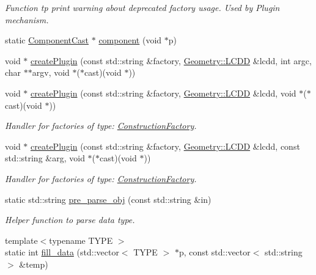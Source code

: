 \begin{DoxyCompactItemize}
\begin{DoxyCompactList}\small\item\em Function tp print warning about deprecated factory usage. Used by Plugin mechanism. \item\end{DoxyCompactList}\item 
static \hyperlink{class_d_d4hep_1_1_component_cast}{ComponentCast} $\ast$ \hyperlink{namespace_d_d4hep_a9bd7c6fd6580a172a3d0a09eb3ea4793}{component} (void $\ast$p)
\item 
void $\ast$ \hyperlink{namespace_d_d4hep_ade40a96f4a17f0bf9cc042946bf4a5aa}{createPlugin} (const std::string \&factory, \hyperlink{class_d_d4hep_1_1_geometry_1_1_l_c_d_d}{Geometry::LCDD} \&lcdd, int argc, char $\ast$$\ast$argv, void $\ast$($\ast$cast)(void $\ast$))
\item 
void $\ast$ \hyperlink{namespace_d_d4hep_a65fff585aba587323f89c263548cad90}{createPlugin} (const std::string \&factory, \hyperlink{class_d_d4hep_1_1_geometry_1_1_l_c_d_d}{Geometry::LCDD} \&lcdd, void $\ast$($\ast$cast)(void $\ast$))
\begin{DoxyCompactList}\small\item\em Handler for factories of type: \hyperlink{class_d_d4hep_1_1_construction_factory}{ConstructionFactory}. \item\end{DoxyCompactList}\item 
void $\ast$ \hyperlink{namespace_d_d4hep_a65c21de63646aa8b39d14ad64e75528e}{createPlugin} (const std::string \&factory, \hyperlink{class_d_d4hep_1_1_geometry_1_1_l_c_d_d}{Geometry::LCDD} \&lcdd, const std::string \&arg, void $\ast$($\ast$cast)(void $\ast$))
\begin{DoxyCompactList}\small\item\em Handler for factories of type: \hyperlink{class_d_d4hep_1_1_construction_factory}{ConstructionFactory}. \item\end{DoxyCompactList}\item 
static std::string \hyperlink{namespace_d_d4hep_a756006d9d570012647e8d27cbe3d1f33}{pre\_\-parse\_\-obj} (const std::string \&in)
\begin{DoxyCompactList}\small\item\em Helper function to parse data type. \item\end{DoxyCompactList}\item 
{\footnotesize template$<$typename TYPE $>$ }\\static int \hyperlink{namespace_d_d4hep_a4c98609dd61d7bfb5450df588fa2ef7f}{fill\_\-data} (std::vector$<$ TYPE $>$ $\ast$p, const std::vector$<$ std::string $>$ \&temp)
$$
\end{DoxyCompactItemize}
